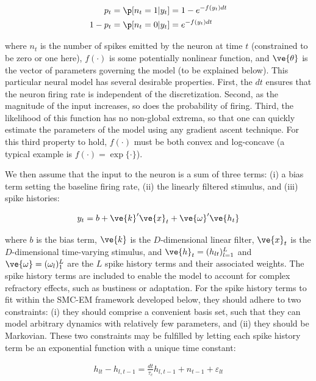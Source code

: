 \begin{equation} \label{eq:p_t}
\begin{split}
p_t &= \p[n_t =1 | y_t] = 1 - e^{-f(y_t) dt}\\
1-p_t&=\p[n_t=0|y_t] =e^{-f(y_t) dt}
\end{split}
\end{equation}

\noindent where $n_t$ is the number of spikes emitted by the neuron at time $t$ (constrained to be zero or one here), $f(\cdot)$ is some potentially nonlinear function, and $\ve{\theta}$ is the vector of parameters governing the model (to be explained below).  This particular neural model has several desirable properties.  First, the $dt$ ensures that the neuron firing rate is independent of the discretization.  Second, as the magnitude of the input increases, so does the probability of firing.  Third, the likelihood of this function has no non-global extrema, so that one can quickly estimate the parameters of the model using any gradient ascent technique\cite{EscolaPaninski07}.  For this third property to hold, $f(\cdot)$ must be both convex and log-concave (a typical example is $f(\cdot)= \exp\{\cdot\}$).

We then assume that the input to the neuron is a sum of three terms: (i) a bias term setting the baseline firing rate, (ii) the linearly filtered stimulus, and (iii) spike histories:

\begin{align} \label{eq:y_t}
y_t = b + \ve{k}' \ve{x}_t + \ve{\omega}' \ve{h_t}
\end{align}

\noindent where $b$ is the bias term, $\ve{k}$ is the $D$-dimensional linear filter, $\ve{x}_t$ is the $D$-dimensional time-varying stimulus, and $\ve{h}_t=(h_{lt})_{l=1}^L$ and $\ve{\omega}=(\omega_l)_1^L$ are the $L$ spike history terms and their associated weights. The spike history terms are included to enable the model to account for complex refractory effects, such as bustiness or adaptation\cite{Paninski04}. For the spike history terms to fit within the SMC-EM framework developed below, they should adhere to two constraints: (i) they should comprise a convenient basis set, such that they can model arbitrary dynamics with relatively few parameters, and (ii) they should be Markovian.  These two constraints may be fulfilled by letting each spike history term be an exponential function with a unique time constant:

\begin{align} \label{eq:h_t}
h_{lt} - h_{l,t-1} = \frac{dt}{\tau_c} h_{l,t-1}  + n_{t-1} + \varepsilon_{lt}%
\end{align}

